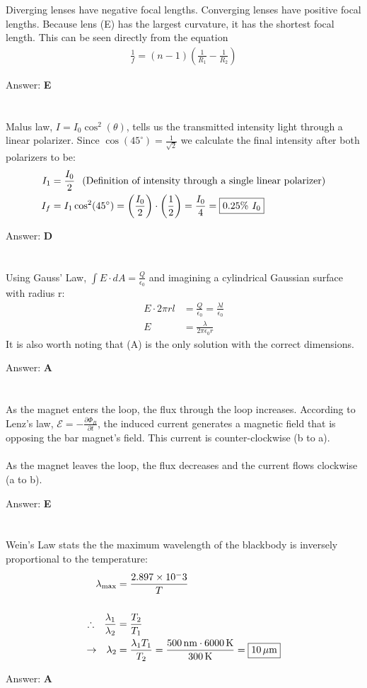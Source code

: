 \documentclass[12pt]{article}
\newcommand{\Answer}[1]{Answer: \textbf{#1}}
\newcommand{\Problem}[3]{
    \setcounter{section}{#1}
    \addtocounter{section}{-1}
    \section{}
    #3\par\par
    \Answer{#2}
}
\begin{document}
\Problem{15}{E}{
Diverging lenses have negative focal lengths. Converging lenses have positive focal lengths. Because lens (E) has the largest curvature, it has the shortest focal length. This can be seen directly from the equation
\begin{align}
\frac{1}{f} = (n-1)\left(\frac{1}{R_{1}}-\frac{1}{R_{2}}\right)
\end{align}
}

\Problem{16}{D}{
Malus law, $I = I_0 \cos^2(\theta)$, tells us the transmitted intensity light through a linear polarizer. Since $\cos(45^{\circ}) = \frac{1}{\sqrt{2}}$ we calculate the final intensity after both polarizers to be:
\begin{align}
I_1 &= \frac{I_0}{2} \hspace{.1in} \text{(Definition of intensity through a single linear polarizer)}\\
I_f &= I_1 \cos^2(45^{\circ}) = \left(\frac{I_0}{2}\right) \cdot \left( \frac{1}{2}\right) = \frac{I_{0}}{4} = \boxed{0.25\% \hspace{.05in} I_{0} }\nonumber
\end{align}
}

\Problem{17}{A}{
Using Gauss' Law, $\int E \cdot dA = \frac{Q}{\epsilon_0}$ and imagining a cylindrical Gaussian surface with radius r:
\begin{align}
E \cdot 2 \pi r l &= \frac{Q}{\epsilon_0} = \frac{\lambda l}{\epsilon_0}\nonumber\\
E &= \boxed{\frac{\lambda}{2 \pi \epsilon_0 r}}\nonumber
\end{align}
It is also worth noting that (A) is the only solution with the correct dimensions.
}

\Problem{18}{E}{
As the magnet enters the loop, the flux through
the loop increases. According to Lenz's law, $\mathcal{E} = -\frac{\partial \Phi_B}{\partial t}$, the induced current generates a magnetic field that is opposing the bar magnet's field. This current is counter-clockwise (b to a).
\\\\
As the magnet leaves the loop, the flux decreases and the current flows clockwise (a to b).
}

\Problem{19}{A}{
Wein's Law stats the the maximum wavelength of the blackbody is inversely proportional to the temperature:
\begin{align}
\lambda_{\max}  &= \frac{2.897\times 10^{-}3}{T}\\
\nonumber\\
\therefore \hspace{.1in} \frac{\lambda_{1}}{\lambda_{2}} &= \frac{T_2}{T_1}\nonumber \\
\rightarrow \hspace{.1in} \lambda_2 &= \frac{\lambda_1T_1}{T_2} =  \frac{500\,\text{nm}\cdot 6000\,\text{K}}{300\,\text{K}} = \boxed{10\,\text{\ensuremath{\mu}m}}\nonumber
\end{align}
}
\end{document}
